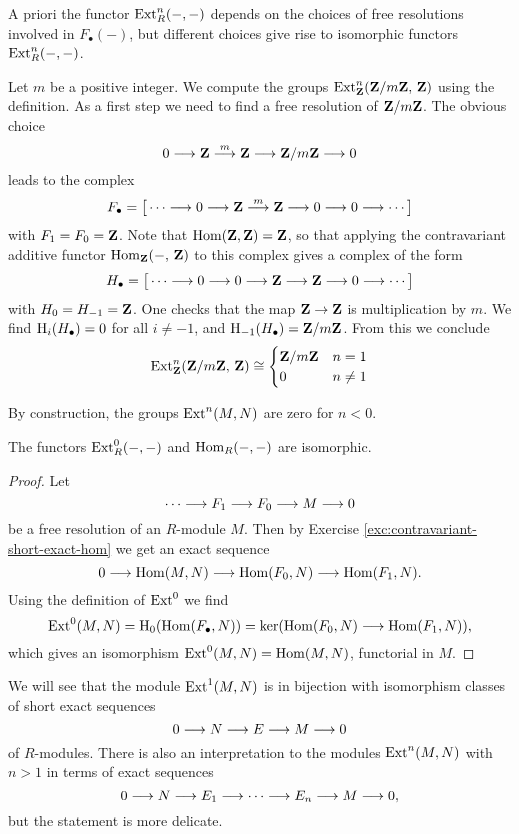 \begin{remark}
A priori the functor $\operatorname{Ext}^n_R(-,-)$ depends on the choices of free resolutions involved in $F_\bullet(-)$, but different choices give rise to isomorphic functors $\operatorname{Ext}^n_R(-,-)$.
\end{remark}

\begin{example}
Let $m$ be a positive integer. We compute the groups $\operatorname{Ext}^n_{{\mathbf{Z}}}({\mathbf{Z}}/m{\mathbf{Z}},\,{\mathbf{Z}})$ using the definition. As a first step we need to find a free resolution of ${\mathbf{Z}}/m{\mathbf{Z}}$. The obvious choice
\[
	0 \longrightarrow {\mathbf{Z}} \overset{m}{\longrightarrow} {\mathbf{Z}} \longrightarrow {\mathbf{Z}}/m{\mathbf{Z}} \longrightarrow 0
\] 
leads to the complex
\[
	F_\bullet = \big[ \cdots \longrightarrow 0 \longrightarrow {\mathbf{Z}} \overset{m}{\longrightarrow} {\mathbf{Z}} \longrightarrow 0 \longrightarrow 0 \longrightarrow \cdots \big]
\]
with $F_1=F_0={\mathbf{Z}}$. Note that $\operatorname{Hom}({\mathbf{Z}},{\mathbf{Z}})= {\mathbf{Z}}$, so that applying the contravariant additive functor $\operatorname{Hom}_{\mathbf{Z}}(-,\,{\mathbf{Z}})$ to this complex gives a complex of the form
\[
	H_\bullet = \big[ \cdots \longrightarrow 0 \longrightarrow 0 \longrightarrow {\mathbf{Z}} \longrightarrow {\mathbf{Z}} \longrightarrow 0 \longrightarrow \cdots \big]
\]
with $H_0=H_{-1} = {\mathbf{Z}}$. One checks that the map ${\mathbf{Z}}\to{\mathbf{Z}}$ is multiplication by $m$. We find ${\mathrm H}_i(H_\bullet)=0$ for all $i\neq -1$, and ${\mathrm H}_{-1}(H_\bullet) = {\mathbf{Z}}/m{\mathbf{Z}}$. From this we conclude
\[
	\operatorname{Ext}^n_{{\mathbf{Z}}}({\mathbf{Z}}/m{\mathbf{Z}},\,{\mathbf{Z}}) \cong \begin{cases} {\mathbf{Z}}/m{\mathbf{Z}} & n = 1 \\ 0 & n \neq 1 \end{cases}
\]

\end{example}


By construction, the groups $\operatorname{Ext}^n(M,N)$ are zero for $n<0$. 

\begin{proposition}
The functors $\operatorname{Ext}^0_R(-,-)$ and $\operatorname{Hom}_R(-,-)$ are isomorphic.
\end{proposition}

\begin{proof}
Let
\[
	\cdots \longrightarrow F_1 \longrightarrow F_0 \longrightarrow M \longrightarrow 0
\]
be a free resolution of an $R$-module $M$. Then by Exercise \ref{exc:contravariant-short-exact-hom} we get
an exact sequence
\[
	0 \longrightarrow \operatorname{Hom}(M,N) \longrightarrow \operatorname{Hom}(F_0,N) \longrightarrow \operatorname{Hom}(F_1,N). 
\]
Using the definition of $\operatorname{Ext}^0$ we find
\[
	\operatorname{Ext}^0(M,N) = {\mathrm H}_0( \operatorname{Hom}(F_\bullet,N))  = 
	\ker( \operatorname{Hom}(F_0,N) \longrightarrow \operatorname{Hom}(F_1,N) ),
\]
which gives an isomorphism $\operatorname{Ext}^0(M,N)=\operatorname{Hom}(M,N)$, functorial in $M$.
\end{proof}


We will see that the module $\operatorname{Ext}^1(M,N)$ is in bijection with isomorphism classes
of short exact sequences
\[
	0 \longrightarrow N \longrightarrow E \longrightarrow M \longrightarrow 0
\]
of $R$-modules. There is also an interpretation to the modules $\operatorname{Ext}^n(M,N)$ with $n>1$ in terms of exact sequences
\[
	 0 \longrightarrow N \longrightarrow E_1 \longrightarrow \cdots \longrightarrow E_n \longrightarrow M \longrightarrow 0,
\]
but the statement is more delicate. 


